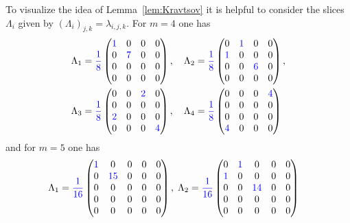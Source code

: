 \begin{example}
	To visualize the idea of Lemma~\ref{lem:Kravtsov} it is helpful to consider the slices $\Lambda_i$ given by $(\Lambda_i)_{j,k} = \lambda_{i,j,k}$.
	For $m=4$ one has
	\begin{align*}
		&\Lambda_1 = {\color{blue}\frac{1}{8}} \begin{pmatrix}
			{\color{blue}1} & 0 & 0 & 0 \\ 0 & {\color{blue}7} & 0 & 0 \\ 0 & 0 & 0 & 0 \\ 0 & 0 & 0 & 0
		\end{pmatrix},\quad
		\Lambda_2 = {\color{blue}\frac{1}{8}} \begin{pmatrix}
			0 & {\color{blue}1} & 0 & 0 \\ {\color{blue}1} & 0 & 0 & 0 \\ 0 & 0 & {\color{blue}6} & 0 \\ 0 & 0 & 0 & 0
		\end{pmatrix},\\
		&\Lambda_3 = {\color{blue}\frac{1}{8}} \begin{pmatrix}
			0 & 0 & {\color{blue}2} & 0 \\ 0 & 0 & 0 & 0 \\ {\color{blue}2} & 0 & 0 & 0 \\ 0 & 0 & 0 & {\color{blue}4}
		\end{pmatrix},\quad
		\Lambda_4 = {\color{blue}\frac{1}{8}} \begin{pmatrix}
			0 & 0 & 0 & {\color{blue}4} \\ 0 & 0 & 0 & 0 \\ 0 & 0 & 0 & 0 \\ {\color{blue}4} & 0 & 0 & 0
		\end{pmatrix}
	\end{align*}
	and for $m = 5$ one has
	{\small \begin{align*}
		&\Lambda_1 = {\color{blue}\frac{1}{16}} \begin{pmatrix}
			{\color{blue}1} & 0 & 0 & 0 & 0 \\ 0 & {\color{blue}15} & 0 & 0 & 0 \\ 0 & 0 & 0 & 0 & 0 \\ 0 & 0 & 0 & 0 & 0 \\ 0 & 0 & 0 & 0 & 0
		\end{pmatrix},\;
		\Lambda_2 = {\color{blue}\frac{1}{16}} \begin{pmatrix}
			0 & {\color{blue}1} & 0 & 0 & 0 \\ {\color{blue}1} & 0 & 0 & 0 & 0 \\ 0 & 0 & {\color{blue}14} & 0 & 0 \\ 0 & 0 & 0 & 0 & 0 \\ 0 & 0 & 0 & 0 & 0

\end{pmatrix}
\end{align*}}
\end{example}
